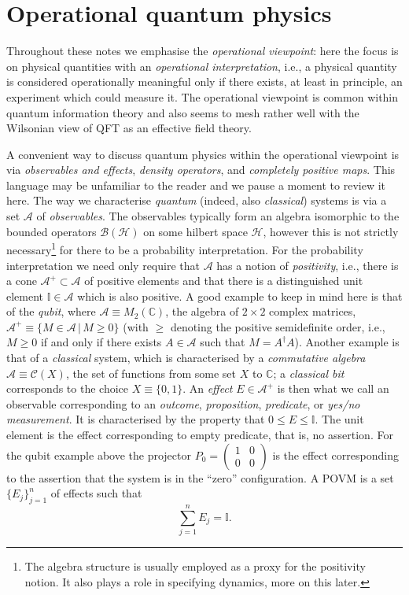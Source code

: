 \documentclass[11pt]{amsart}
\theoremstyle{plain}%
\theoremstyle{definition}
\theoremstyle{remark}
\begin{document}
\section{Operational quantum physics}\label{sec:opqp}
Throughout these notes we emphasise the \emph{operational viewpoint}: here the focus is on physical quantities with an \emph{operational interpretation}, i.e., a physical quantity is considered operationally meaningful only if there exists, at least in principle, an experiment which could measure it. The operational viewpoint is common within quantum information theory and also seems to mesh rather well with the Wilsonian view of QFT as an effective field theory. 

A convenient way to discuss quantum physics within the operational viewpoint is via \emph{observables and effects}, \emph{density operators}, and \emph{completely positive maps}. This language may be unfamiliar to the reader and we pause a moment to review it here. The way we characterise \emph{quantum} (indeed, also \emph{classical}) systems is via a set $\mathcal{A}$ of \emph{observables}. The observables typically form an algebra isomorphic to the bounded operators $\mathcal{B}(\mathcal{H})$ on some hilbert space $\mathcal{H}$, however this is not strictly necessary\footnote{The algebra structure is usually employed as a proxy for the positivity notion. It also plays a role in specifying dynamics, more on this later.} for there to be a probability interpretation. For the probability interpretation we need only require that $\mathcal{A}$ has a notion of \emph{positivity}, i.e., there is a cone $\mathcal{A}^+ \subset \mathcal{A}$ of positive elements and that there is a distinguished unit element $\mathbb{I}\in\mathcal{A}$ which is also positive. A good example to keep in mind here is that of the \emph{qubit}, where $\mathcal{A}\equiv M_2(\mathbb{C})$, the algebra of $2\times 2$ complex matrices, $\mathcal{A}^+ \equiv \{M\in \mathcal{A}\,|\, M\ge 0\}$ (with $\ge$ denoting the positive semidefinite order, i.e., $M\ge 0$ if and only if there exists $A\in \mathcal{A}$ such that $M = A^\dag A$). Another example is that of a \emph{classical} system, which is characterised by a \emph{commutative algebra} $\mathcal{A}\equiv \mathcal{C}(X)$, the set of functions from some set $X$ to $\mathbb{C}$; a \emph{classical bit} corresponds to the choice $X \equiv \{0,1\}$. An \emph{effect} $E\in\mathcal{A}^+$ is then what we call an observable corresponding to an \emph{outcome}, \emph{proposition}, \emph{predicate}, or \emph{yes/no measurement}. It is characterised by the property that $0\le E\le \mathbb{I}$. The unit element is the effect corresponding to empty predicate, that is, no assertion. For the qubit example above the projector $P_0 = \left(\begin{smallmatrix} 1 & 0 \\ 0 & 0\end{smallmatrix}\right)$ is the effect corresponding to the assertion that the system is in the ``zero'' configuration. A POVM is a set $\{E_j\}_{j=1}^n$ of effects such that 
\begin{equation}
	\sum_{j=1}^n E_j = \mathbb{I}.
\end{equation}
\end{document}
